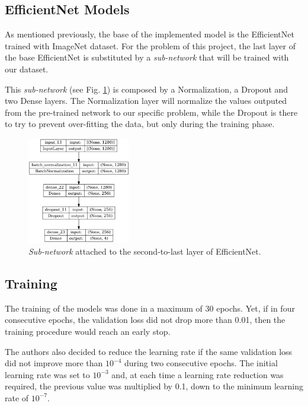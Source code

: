 \documentclass[conference]{IEEEtran}
\begin{document}
\subsection{EfficientNet Models}

As mentioned previously, the base of the implemented model is the EfficientNet trained with ImageNet dataset. For the problem of this project, the last layer of the base EfficientNet is substituted by a \textit{sub-network} that will be trained with our dataset.

This \textit{sub-network} (see Fig. \ref{fig:subnetwork}) is composed by a Normalization, a Dropout and two Dense layers. The Normalization layer will normalize the values outputed from the pre-trained network to our specific problem, while the Dropout is there to try to prevent over-fitting the data, but only during the training phase.

\begin{figure}[htp]
    \centering
    \includegraphics[width=0.4\textwidth]{imgs/model_plot.png}
    \caption{\textit{Sub-network} attached to the second-to-last layer of EfficientNet.}
    \label{fig:subnetwork}
\end{figure}

\subsection{Training}
\label{sec:training}

The training of the models was done in a maximum of 30 epochs. Yet, if in four consecutive epochs, the validation loss did not drop more than 0.01, then the training procedure would reach an early stop.

The authors also decided to reduce the learning rate if the same validation loss did not improve more than $10^{-4}$ during two consecutive epochs. The initial learning rate was set to $10^{-3}$ and, at each time a learning rate reduction was required, the previous value was multiplied by 0.1, down to the minimum learning rate of $10^{-7}$.
\end{document}
